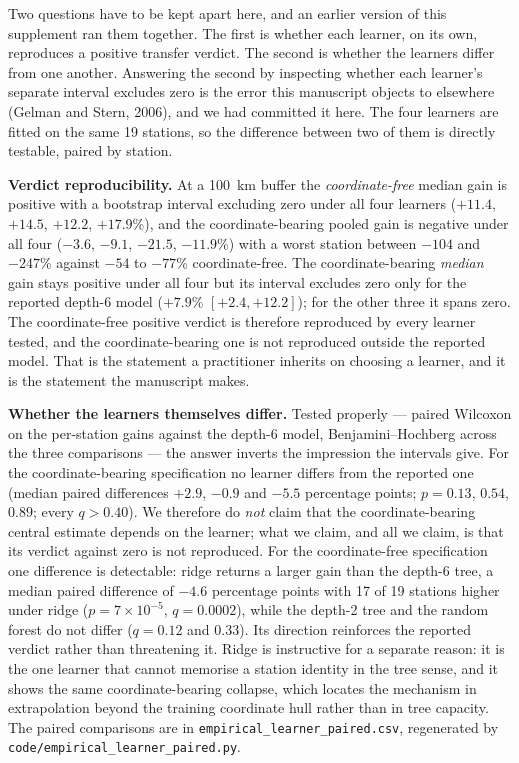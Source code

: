 \documentclass[11pt]{article}
\begin{document}
Two questions have to be kept apart here, and an earlier version of this supplement ran them
together. The first is whether each learner, on its own, reproduces a positive transfer verdict.
The second is whether the learners differ from one another. Answering the second by inspecting
whether each learner's separate interval excludes zero is the error this manuscript objects to
elsewhere (Gelman and Stern, 2006), and we had committed it here. The four learners are fitted on
the same 19 stations, so the difference between two of them is directly testable, paired by station.

\textbf{Verdict reproducibility.} At a 100~km buffer the \emph{coordinate-free} median gain is
positive with a bootstrap interval excluding zero under all four learners ($+11.4$, $+14.5$,
$+12.2$, $+17.9$\%), and the coordinate-bearing pooled gain is negative under all four ($-3.6$,
$-9.1$, $-21.5$, $-11.9$\%) with a worst station between $-104$ and $-247$\% against $-54$ to
$-77$\% coordinate-free. The coordinate-bearing \emph{median} gain stays positive under all four
but its interval excludes zero only for the reported depth-6 model ($+7.9\%$ $[+2.4,+12.2]$); for
the other three it spans zero. The coordinate-free positive verdict is therefore reproduced by every
learner tested, and the coordinate-bearing one is not reproduced outside the reported model. That is
the statement a practitioner inherits on choosing a learner, and it is the statement the manuscript
makes.

\textbf{Whether the learners themselves differ.} Tested properly --- paired Wilcoxon on the
per-station gains against the depth-6 model, Benjamini--Hochberg across the three comparisons --- the
answer inverts the impression the intervals give. For the coordinate-bearing specification no learner
differs from the reported one (median paired differences $+2.9$, $-0.9$ and $-5.5$ percentage points;
$p=0.13$, $0.54$, $0.89$; every $q>0.40$). We therefore do \emph{not} claim that the coordinate-bearing
central estimate depends on the learner; what we claim, and all we claim, is that its verdict against
zero is not reproduced. For the coordinate-free specification one difference is detectable: ridge
returns a larger gain than the depth-6 tree, a median paired difference of $-4.6$ percentage points
with 17 of 19 stations higher under ridge ($p=7\times10^{-5}$, $q=0.0002$), while the depth-2 tree and
the random forest do not differ ($q=0.12$ and $0.33$). Its direction reinforces the reported verdict
rather than threatening it. Ridge is instructive for a separate reason: it is the one learner that
cannot memorise a station identity in the tree sense, and it shows the same coordinate-bearing
collapse, which locates the mechanism in extrapolation beyond the training coordinate hull rather
than in tree capacity. The paired comparisons are in \texttt{empirical\_learner\_paired.csv}, regenerated by \texttt{code/empirical\_learner\_paired.py}.
\end{document}
